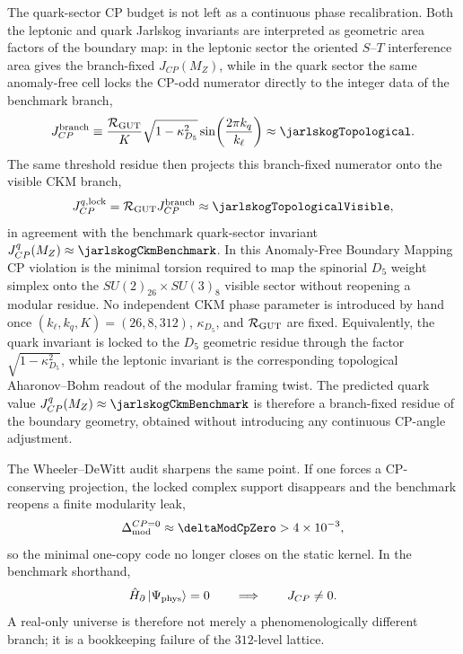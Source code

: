 \documentclass[11pt]{article}
\begin{document}
The quark-sector CP budget is not left as a continuous phase recalibration. Both the leptonic and quark Jarlskog invariants are interpreted as geometric area factors of the boundary map: in the leptonic sector the oriented $S$--$T$ interference area gives the branch-fixed $J_{CP}(M_Z)$, while in the quark sector the same anomaly-free cell locks the CP-odd numerator directly to the integer data of the benchmark branch,
\begin{equation}
 J_{CP}^{\rm branch}
 \equiv
 \frac{\mathcal R_{\rm GUT}}{K}
 \sqrt{1-\kappa_{D_5}^2}
 \sin\!\left(\frac{2\pi k_q}{k_{\ell}}\right)
 \approx \jarlskogTopological.
\end{equation}
The same threshold residue then projects this branch-fixed numerator onto the visible CKM branch,
\begin{equation}
 J_{CP}^{q,{\rm lock}}
 =
 \mathcal R_{\rm GUT} J_{CP}^{\rm branch}
 \approx
 \jarlskogTopologicalVisible,
\end{equation}
in agreement with the benchmark quark-sector invariant $J_{CP}^{q}(M_Z)\approx\jarlskogCkmBenchmark$. In this Anomaly-Free Boundary Mapping CP violation is the minimal torsion required to map the spinorial $D_5$ weight simplex onto the $SU(2)_{26}\times SU(3)_8$ visible sector without reopening a modular residue. No independent CKM phase parameter is introduced by hand once $(k_{\ell},k_q,K)=(26,8,312)$, $\kappa_{D_5}$, and $\mathcal R_{\rm GUT}$ are fixed.
Equivalently, the quark invariant is locked to the $D_5$ geometric residue through the factor $\sqrt{1-\kappa_{D_5}^2}$, while the leptonic invariant is the corresponding topological Aharonov--Bohm readout of the modular framing twist. The predicted quark value $J_{CP}^{q}(M_Z)\approx\jarlskogCkmBenchmark$ is therefore a branch-fixed residue of the boundary geometry, obtained without introducing any continuous CP-angle adjustment.

The Wheeler--DeWitt audit sharpens the same point. If one forces a CP-conserving projection, the locked complex support disappears and the benchmark reopens a finite modularity leak,
\begin{equation}
 \Delta_{\rm mod}^{CP=0}\approx \deltaModCpZero > 4\times10^{-3},
\end{equation}
so the minimal one-copy code no longer closes on the static kernel. In the benchmark shorthand,
\begin{equation}
 \hat H_{\partial}\ket{\Psi_{\rm phys}}=0
 \qquad\Longrightarrow\qquad
 J_{CP}\neq0.
\end{equation}
A real-only universe is therefore not merely a phenomenologically different branch; it is a bookkeeping failure of the $312$-level lattice.
\end{document}

